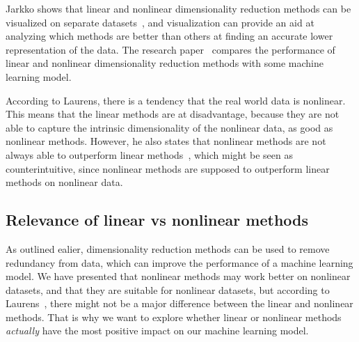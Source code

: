 Jarkko shows that linear and nonlinear dimensionality reduction methods can be visualized on separate datasets~\cite{dim-red-visual}, and visualization can provide an aid at analyzing which methods are better than others at finding an accurate lower representation of the data. The research paper~\cite{dimensionality-reduction-comparative-review} compares the performance of linear and nonlinear dimensionality reduction methods with some machine learning model.

According to Laurens, there is a tendency that the real world data is nonlinear. This means that the linear methods are at disadvantage, because they are not able to capture the intrinsic dimensionality of the nonlinear data, as good as nonlinear methods. However, he also states that nonlinear methods are not always able to outperform linear methods~\cite{dimensionality-reduction-comparative-review}, which might be seen as counterintuitive, since nonlinear methods are supposed to outperform linear methods on nonlinear data.


\subsection{Relevance of linear vs nonlinear methods}

As outlined ealier, dimensionality reduction methods can be used to remove redundancy from data, which can improve the performance of a machine learning model. We have presented that nonlinear methods may work better on nonlinear datasets, and that they are suitable for nonlinear datasets, but according to Laurens~\cite{dimensionality-reduction-comparative-review}, there might not be a major difference between the linear and nonlinear methods. That is why we want to explore whether linear or nonlinear methods \textit{actually} have the most positive impact on our machine learning model.






